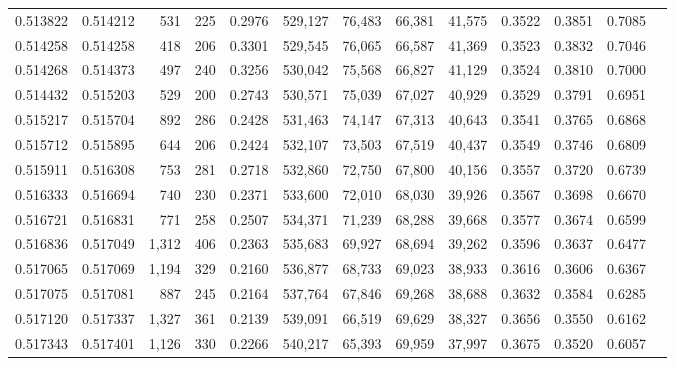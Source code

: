 \begin{tabular}{rrrrrrrrrrrrr}
0.513822 & 0.514212 &    531 &   225 &                                     0.2976 & 529,127 &  76,483 &  66,381 &  41,575 & 0.3522 & 0.3851 & 0.7085 \\
0.514258 & 0.514258 &    418 &   206 &                                     0.3301 & 529,545 &  76,065 &  66,587 &  41,369 & 0.3523 & 0.3832 & 0.7046 \\
0.514268 & 0.514373 &    497 &   240 &                                     0.3256 & 530,042 &  75,568 &  66,827 &  41,129 & 0.3524 & 0.3810 & 0.7000 \\
0.514432 & 0.515203 &    529 &   200 &                                     0.2743 & 530,571 &  75,039 &  67,027 &  40,929 & 0.3529 & 0.3791 & 0.6951 \\
0.515217 & 0.515704 &    892 &   286 &                                     0.2428 & 531,463 &  74,147 &  67,313 &  40,643 & 0.3541 & 0.3765 & 0.6868 \\
0.515712 & 0.515895 &    644 &   206 &                                     0.2424 & 532,107 &  73,503 &  67,519 &  40,437 & 0.3549 & 0.3746 & 0.6809 \\
0.515911 & 0.516308 &    753 &   281 &                                     0.2718 & 532,860 &  72,750 &  67,800 &  40,156 & 0.3557 & 0.3720 & 0.6739 \\
0.516333 & 0.516694 &    740 &   230 &                                     0.2371 & 533,600 &  72,010 &  68,030 &  39,926 & 0.3567 & 0.3698 & 0.6670 \\
0.516721 & 0.516831 &    771 &   258 &                                     0.2507 & 534,371 &  71,239 &  68,288 &  39,668 & 0.3577 & 0.3674 & 0.6599 \\
0.516836 & 0.517049 &  1,312 &   406 &                                     0.2363 & 535,683 &  69,927 &  68,694 &  39,262 & 0.3596 & 0.3637 & 0.6477 \\
0.517065 & 0.517069 &  1,194 &   329 &                                     0.2160 & 536,877 &  68,733 &  69,023 &  38,933 & 0.3616 & 0.3606 & 0.6367 \\
0.517075 & 0.517081 &    887 &   245 &                                     0.2164 & 537,764 &  67,846 &  69,268 &  38,688 & 0.3632 & 0.3584 & 0.6285 \\
0.517120 & 0.517337 &  1,327 &   361 &                                     0.2139 & 539,091 &  66,519 &  69,629 &  38,327 & 0.3656 & 0.3550 & 0.6162 \\
0.517343 & 0.517401 &  1,126 &   330 &                                     0.2266 & 540,217 &  65,393 &  69,959 &  37,997 & 0.3675 & 0.3520 & 0.6057 \\

\end{tabular}
